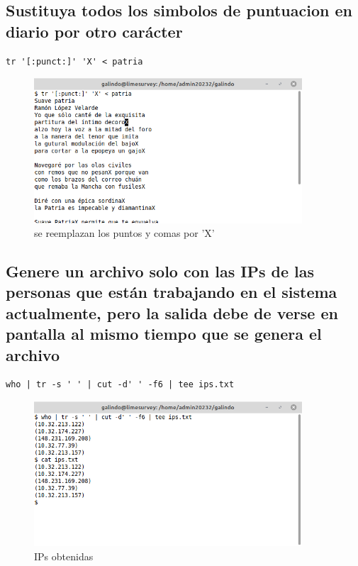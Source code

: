 \documentclass[11pt]{article}
\begin{document}
\subsection{Sustituya todos los simbolos de puntuacion en diario por otro carácter}
\label{sec:org723e1e9}

\begin{verbatim}
tr '[:punct:]' 'X' < patria
\end{verbatim}

\begin{figure}[htbp]
\centering
\includegraphics[width=10cm]{img/11.png}
\caption{se reemplazan los puntos y comas por 'X'}
\end{figure}

\pagebreak

\subsection{Genere un archivo solo con las IPs de las personas que están trabajando en el sistema actualmente, pero la salida debe de verse en pantalla al mismo tiempo que se genera el archivo}
\label{sec:orgbf3f52d}
\begin{verbatim}
who | tr -s ' ' | cut -d' ' -f6 | tee ips.txt
\end{verbatim}

\begin{figure}[htbp]
\centering
\includegraphics[width=10cm]{img/13.png}
\caption{IPs obtenidas}
\end{figure} 
\end{document}
